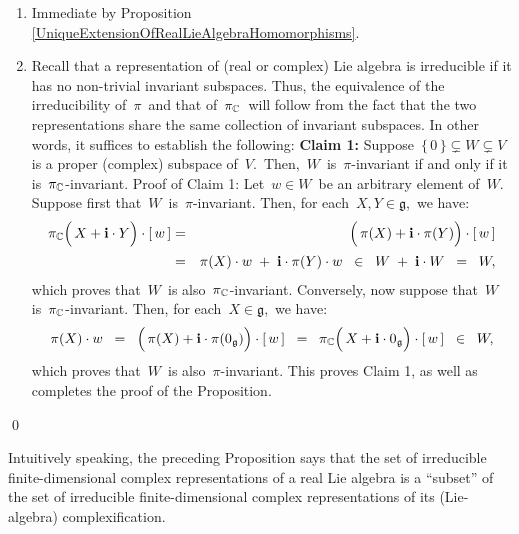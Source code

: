 \begin{enumerate}
\item
	Immediate by Proposition \ref{UniqueExtensionOfRealLieAlgebraHomomorphisms}.
\item
	Recall that a representation of (real or complex) Lie algebra is irreducible if it has
	no non-trivial invariant subspaces.
	Thus, the equivalence of the irreducibility of \,$\pi$\, and that of \,$\pi_{\mathbb{C}}$\,
	will follow from the fact that the two representations share the same collection
	of invariant subspaces. In other words, it suffices to establish the following:
	\vskip 0.2cm
	\noindent
	\textbf{Claim 1:}\quad
	Suppose \,$\{\,0\,\} \subsetneq W \subsetneq V$\, is a proper (complex) subspace of \,$V$.\,
	Then, \,$W$\, is \,$\pi$-invariant if and only if it is \,$\pi_{\mathbb{C}}$-invariant. 
	\vskip 0.1cm
	\noindent
	Proof of Claim 1:\quad
	Let \,$w \in W$\, be an arbitrary element of \,$W$.\,
	Suppose first that \,$W$\, is \,$\pi$-invariant.
	Then, for each \,$X, Y \in \mathfrak{g}$,\, we have:
	\begin{eqnarray*}
	\pi_{\C}\!\left(\,X \overset{{\color{white}.}}{+} \i\cdot Y \right) \cdot [\,w\,]
	& = &
		\left(\,\pi(X) \overset{{\color{white}.}}{+} \i\cdot \pi(Y) \right) \cdot [\,w\,]
	\\
	& = &
		\pi(X) \cdot w \;\overset{{\color{white}.}}{+}\; \i\cdot \pi(Y) \cdot w
	\;\; \in \;\;
		W \; + \; \i \cdot W
	\;\; = \;\;
		W,
	\end{eqnarray*}
	which proves that \,$W$\, is also \,$\pi_{\mathbb{C}}$-invariant.
	Conversely, now suppose that \,$W$\, is \,$\pi_{\mathbb{C}}$-invariant.
	Then, for each \,$X \in \mathfrak{g}$,\, we have:
	\begin{equation*}
	\pi(X)\cdot w
	\;\; = \;\;
		\left(\,\pi(X) \overset{{\color{white}.}}{+} \i\cdot \pi(0_{\mathfrak{g}}) \right) \cdot [\,w\,]
	\;\; = \;\;
		\pi_{\C}\!\left(\,X \overset{{\color{white}.}}{+} \i\cdot 0_{\mathfrak{g}} \right) \cdot [\,w\,]
	\;\; \in \;\;
		W,
	\end{equation*}
	which proves that \,$W$\, is also \,$\pi$-invariant.
	This proves Claim 1, as well as completes the proof of the Proposition.
\end{enumerate}
\qed

\vskip 0.5cm
{\color{red}
\begin{remark}
\mbox{}
\vskip 0.05cm
\noindent
Intuitively speaking, the preceding Proposition says that
the set of irreducible finite-dimensional complex representations of a real Lie algebra
is a ``subset'' of 
the set of irreducible finite-dimensional complex representations of its (Lie-algebra) complexification.
\end{remark}
}

